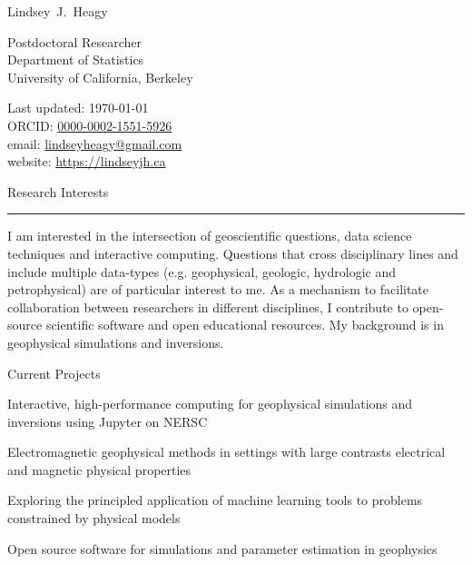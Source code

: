 \documentclass[a4paper, 11pt]{article}
\makeatletter
\newcommand{\firstname}{Lindsey}
\newcommand{\middleinitial}{J.}
\newcommand{\lastname}{Heagy}
\newcommand{\emailaddress}{lindseyheagy@gmail.com}
\newcommand{\email}{\href{mailto:\emailaddress}{\emailaddress}}
\newcommand{\websiteurl}{https://lindseyjh.ca}
\newcommand{\website}{\href{\websiteurl}{\websiteurl}}
\newcommand{\ORCIDNumber}{0000-0002-1551-5926}
\newcommand{\ORCID}{\href{https://orcid.org/\ORCIDNumber}{\ORCIDNumber}}
\newcommand{\position}{Postdoctoral Researcher}
\newcommand{\affiliation}{
    Department of Statistics \\
    University of California, Berkeley
}
\newcommand{\fullname}{\firstname\ \middleinitial\  \lastname}
\newcommand{\mytitle}[1]{
    {%
    \Huge #1
    }\\[0.35cm]
}
\newcommand{\heading}[1]{
    \begin{minipage}[t]{\textwidth}
    \vspace{0.45cm}
    {\LARGE #1}\\
    \vspace{-0.2cm}
    \hrule
    \end{minipage}
    \vspace{0.2cm}

}
\newcommand{\subheading}[1]{
    \vspace{0.4cm}
    {\Large #1}\\
    \vspace{-0.2cm}
}
\makeatother
\begin{document}
\thispagestyle{empty}


\mytitle{\fullname}
\begin{minipage}[t]{0.595\textwidth}
    \position \\
    \affiliation
\end{minipage}
\begin{minipage}[t]{0.4\textwidth}
    \begin{flushright}
        Last updated: \monthyear\today
        \\
        ORCID: \ORCID
        \\
        email: \email
        \\
        website: \website
    \end{flushright}
\end{minipage}


\heading{Research Interests}

I am interested in the intersection of geoscientific questions, data science techniques and interactive computing. Questions that cross disciplinary lines and include multiple data-types (e.g. geophysical, geologic, hydrologic and petrophysical) are of particular interest to me. As a mechanism to facilitate collaboration between researchers in different disciplines, I contribute to open-source scientific software and open educational resources. My background is in geophysical simulations and inversions.

\subheading{Current Projects}
\begin{myitemize}
    \item{Interactive, high-performance computing for geophysical simulations and inversions using Jupyter on NERSC}
    \item{Electromagnetic geophysical methods in settings with large contrasts electrical and magnetic physical properties}
    \item{Exploring the principled application of machine learning tools to problems constrained by physical models}
    \item{Open source software for simulations and parameter estimation in geophysics}
\end{myitemize}
\end{document}
